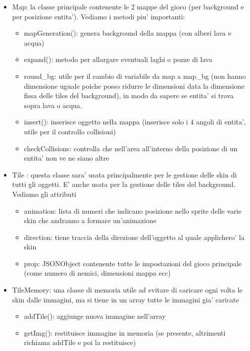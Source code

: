 \documentclass[12pt,a4paper]{report}
\begin{document}
\begin{itemize}
\item Map: la classe principale contenente le 2 mappe del gioco (per background e per posizione entita'). Vediamo i metodi piu' importanti: 
\begin{itemize}
\item mapGeneration(): genera background della mappa (con alberi lava e acqua)
\item expand(): metodo per allargare eventuali laghi o pozze di lava
\item round\_bg: utile per il cambio di variabile da map a map\_bg (non hanno dimensione uguale poiche posso ridurre le dimensioni data la dimensione fissa delle tiles del background), in modo da sapere se entita' si trova sopra lava o acqua.
\item insert(): inserisce oggetto nella mappa (inserisce solo i 4 angoli di entita', utile per il controllo collisioni)
\item checkCollisions: controlla che nell'area all'interno della posizione di un entita' non ve ne siano altre
\end{itemize}


\item Tile : questa classe sara' usata principalmente per le gestione delle skin di tutti gli oggetti. E' anche usata per la gestione delle tiles del background. Vediamo gli attributi
\begin{itemize}
\item animation: lista di numeri che indicano posizione nello sprite delle varie skin che andranno a formare un'animazione
\item direction: tiene traccia della direzione dell'oggetto al quale applichero' la skin
\item prop: JSONObject contenente tutte le impostazioni del gioco principale (come numero di nemici, dimensioni mappa ecc)
\end{itemize}

\item TileMemory: una classe di memoria utile ad evitare di caricare ogni volta le skin dalle immagini, ma si tiene in un array tutte le immagini gia' caricate
\begin{itemize}
\item addTile(): aggiunge nuova immagine nell'array
\item getImg(): restituisce immagine in memoria (se presente, altrimenti richiama addTile e poi la restituisce)

\end{itemize}
\end{itemize}
\newpage
\end{document}
